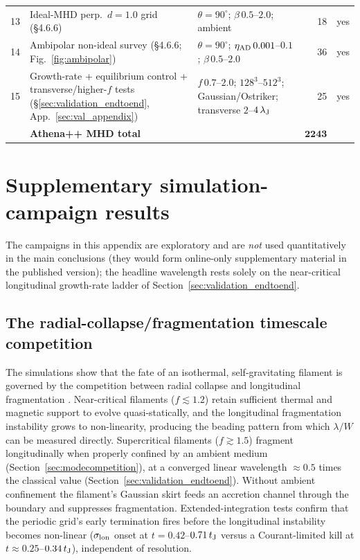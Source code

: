 \documentclass[usenatbib,twoside,twocolumn]{mnras}
\begin{document}
\begin{table}
\begin{tabular}{cllrl}
13 & Ideal-MHD perp.\ $d=1.0$ grid (\S4.6.6) & $\theta=90^\circ$; $\beta\,0.5$--$2.0$; ambient & 18 & yes \\
14 & Ambipolar non-ideal survey (\S4.6.6; Fig.~\ref{fig:ambipolar}) & $\theta=90^\circ$; $\eta_{\rm AD}\,0.001$--$0.1$; $\beta\,0.5$--$2.0$ & 36 & yes \\
15 & Growth-rate + equilibrium control + transverse/higher-$f$ tests (\S\ref{sec:validation_endtoend}, App.~\ref{sec:val_appendix}) & $f\,0.7$--$2.0$; $128^3$--$512^3$; Gaussian/Ostriker; transverse $2$--$4\,\lambda_{\rm J}$ & 25 & yes \\
\midrule
   & \textbf{Athena++ MHD total} & & $\boldsymbol{2243}$ & \\
\bottomrule
\end{tabular}
\end{table}


\section{Supplementary simulation-campaign results}
\label{sec:supplementary_campaigns_app}

The campaigns in this appendix are exploratory and are \emph{not} used quantitatively in the main conclusions (they would form online-only supplementary material in the published version); the headline wavelength rests solely on the near-critical longitudinal growth-rate ladder of Section~\ref{sec:validation_endtoend}.

\subsection{The radial-collapse/fragmentation timescale competition}
\label{sec:regimes}

The simulations show that the fate of an isothermal, self-gravitating filament is governed by the competition between radial collapse and longitudinal fragmentation \citep{Inutsuka1997, Pon2012}. Near-critical filaments ($f\lesssim1.2$) retain sufficient thermal and magnetic support to evolve quasi-statically, and the longitudinal fragmentation instability grows to non-linearity, producing the beading pattern from which $\lambda/W$ can be measured directly. Supercritical filaments ($f\gtrsim1.5$) fragment longitudinally when properly confined by an ambient medium (Section~\ref{sec:modecompetition}), at a converged linear wavelength $\approx0.5$ times the classical value (Section~\ref{sec:validation_endtoend}). Without ambient confinement the filament's Gaussian skirt feeds an accretion channel through the boundary and suppresses fragmentation. Extended-integration tests confirm that the periodic grid's early termination fires before the longitudinal instability becomes non-linear ($\sigma_{\rm lon}$ onset at $t=0.42$--$0.71\,t_{\rm J}$ versus a Courant-limited kill at $t\approx0.25$--$0.34\,t_{\rm J}$), independent of resolution.
\end{document}

